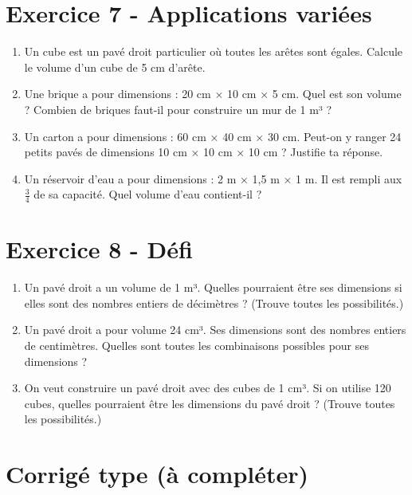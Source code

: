 \documentclass[12pt, a4paper]{article}
\begin{document}
\section*{Exercice 7 - Applications variées}
\begin{enumerate}[label=\textbf{\arabic*.}]
    \item Un cube est un pavé droit particulier où toutes les arêtes sont égales. Calcule le volume d'un cube de 5 cm d'arête.
    \item Une brique a pour dimensions : 20 cm × 10 cm × 5 cm. Quel est son volume ? Combien de briques faut-il pour construire un mur de 1 m³ ?
    \item Un carton a pour dimensions : 60 cm × 40 cm × 30 cm. Peut-on y ranger 24 petits pavés de dimensions 10 cm × 10 cm × 10 cm ? Justifie ta réponse.
    \item Un réservoir d'eau a pour dimensions : 2 m × 1,5 m × 1 m. Il est rempli aux $\frac{3}{4}$ de sa capacité. Quel volume d'eau contient-il ?
\end{enumerate}

\section*{Exercice 8 - Défi}
\begin{enumerate}[label=\textbf{\arabic*.}]
    \item Un pavé droit a un volume de 1 m³. Quelles pourraient être ses dimensions si elles sont des nombres entiers de décimètres ? (Trouve toutes les possibilités.)
    \item Un pavé droit a pour volume 24 cm³. Ses dimensions sont des nombres entiers de centimètres. Quelles sont toutes les combinaisons possibles pour ses dimensions ?
    \item On veut construire un pavé droit avec des cubes de 1 cm³. Si on utilise 120 cubes, quelles pourraient être les dimensions du pavé droit ? (Trouve toutes les possibilités.)
\end{enumerate}

\section*{Corrigé type (à compléter)}
\begin{center}
\end{center}
\end{document}
